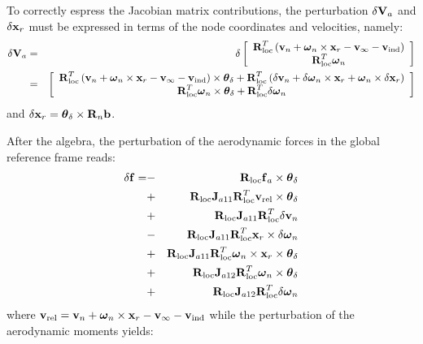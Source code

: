 To correctly espress the Jacobian matrix contributions, the perturbation 
$\delta\T{V}_a$ and $\delta \T{x}_r$ must be expressed in terms of 
the node coordinates and velocities, namely:
\begin{eqnarray}
	\delta\T{V}_a &=& \delta\sqbr{\matr{c}{
		\T{R}^T_{\text{loc}} \plbr{\T{v}_n + \T{\omega}_n\times\T{x}_r
			- \T{v}_{\infty} - \T{v}_{\text{ind}}}\\
		\T{R}^T_{\text{loc}} \T{\omega}_n
		}} \\
\nonumber&=&\sqbr{\matr{c}{
	\T{R}^T_{\text{loc}}\plbr{
			\T{v}_n + \T{\omega}_n\times\T{x}_r 
			- \T{v}_{\infty} - \T{v}_{\text{ind}}} \times \T{\theta}_\delta+ 
			\T{R}^T_{\text{loc}}\plbr{
				\delta\T{v}_n + \delta\T{\omega}_n\times\T{x}_r +
				\T{\omega}_n\times\delta\T{x}_r}\\
	\T{R}^T_{\text{loc}}\T{\omega}_n \times\T{\theta}_\delta+ \T{R}^T_{\text{loc}}\delta\T{\omega}_n
	}}
\end{eqnarray}
and $\delta\T{x}_r = \T{\theta}_\delta\times\T{R}_n\T{b}$.

After the algebra, the perturbation of the aerodynamic forces  
in the global reference frame reads:
\begin{eqnarray}\label{eq:deltaF}
\nonumber \delta\T{f} = 
\nonumber	&-& \T{R}_{\text{loc}}\T{f}_a\times\T{\theta}_\delta \\
\nonumber	&+& \T{R}_{\text{loc}}\T{J}_{a11}\T{R}^T_{\text{loc}}\T{v}_{\text{rel}}\times\T{\theta}_\delta\\
\nonumber	&+& \T{R}_{\text{loc}}\T{J}_{a11}\T{R}^T_{\text{loc}}\delta\T{v}_n\\
\nonumber	&-& \T{R}_{\text{loc}}\T{J}_{a11}\T{R}^T_{\text{loc}}
			\T{x}_r\times\delta\T{\omega}_n\\
\nonumber	&+& \T{R}_{\text{loc}}\T{J}_{a11}\T{R}^T_{\text{loc}}
			\T{\omega}_n\times\T{x}_r\times\T{\theta}_\delta\\
\nonumber	&+& \T{R}_{\text{loc}}\T{J}_{a12}\T{R}^T_{\text{loc}}\T{\omega}_n
			\times\T{\theta}_\delta\\
		&+& \T{R}_{\text{loc}}\T{J}_{a12}\T{R}^T_{\text{loc}}\delta\T{\omega}_n
\end{eqnarray}
where $\T{v}_{\text{rel}} = \T{v}_n + \T{\omega}_n\times\T{x}_r 
			- \T{v}_{\infty} - \T{v}_{\text{ind}}$
while the perturbation of the aerodynamic moments yields:

